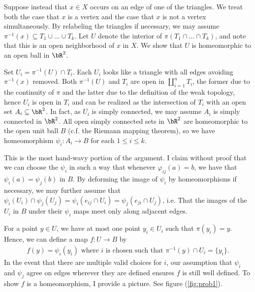 \begin{homework}[e]
\begin{prf}
		Suppose instead that $x \in X$ occurs on an edge of one of the triangles. We treat both the case that $x$ is a vertex and the case that $x$ is not a vertex simultaneously. By relabeling the triangles if necessary, we may assume $\pi^{-1}(x) \subseteq T_1\cup...\cup T_k$. Let $U$ denote the interior of $\pi(T_1\cap ...\cap T_k)$, and note that this is an open neighborhood of $x$ in $X$. We show that $U$ is homeomorphic to an open ball in $\bR^2$.

		Set $U_i = \pi^{-1}(U) \cap T_i$. Each $U_i$ looks like a triangle with all edges avoiding $\pi^{-1}(x)$ removed. Both $\pi^{-1}(U)$ and $T_i$ are open in $\coprod_{i=1}^n T_i$, the former due to the continuity of $\pi$ and the latter due to the definition of the weak topology, hence $U_i$ is open in $T_i$ and can be realized as the intersection of $T_i$ with an open set $A_i \subseteq \bR^2$. In fact, as $U_i$ is simply connected, we may assume $A_i$ is simply connected in $\bR^2$. All open simply connected sets in $\bR^2$ are homeomorphic to the open unit ball $B$ (c.f. the Riemann mapping theorem), so we have homeomorphism $\psi_i:A_i \to B$ for each $1\leq i\leq k$.

		This is the most hand-wavy portion of the argument. I claim without proof that we can choose the $\psi_i$ in such a way that whenever $\varphi_{ij}(a) = b$, we have that $\psi_i(a) = \psi_j(b)$ in $B$. By deforming the image of $\psi_i$ by homeomorphisms if necessary, we may further assume that $\psi_i(U_i) \cap \psi_j(U_j) = \psi_i(e_{ij} \cap U_i) = \psi_j(e_{ji} \cap U_j)$, i.e. That the images of the $U_i$ in $B$ under their $\psi_i$ maps meet only along adjacent edges. 

		For a point $y \in U$, we have at most one point $y_i \in U_i$ such that $\pi(y_i) = y$. Hence, we can define a map $f:U \to B$ by
		\begin{align*}
			f(y) = \psi_i(y_i) \text{ where $i$ is chosen such that } \pi^{-1}(y)\cap U_i = \{y_i\}.
		\end{align*}
		In the event that there are multiple valid choices for $i$, our assumption that $\psi_i$ and $\psi_j$ agree on edges wherever they are defined ensures $f$ is still well defined. To show $f$ is a homeomorphism, I provide a picture. See figure (\ref{fig:prob1}).
	\end{prf}


\end{homework}
